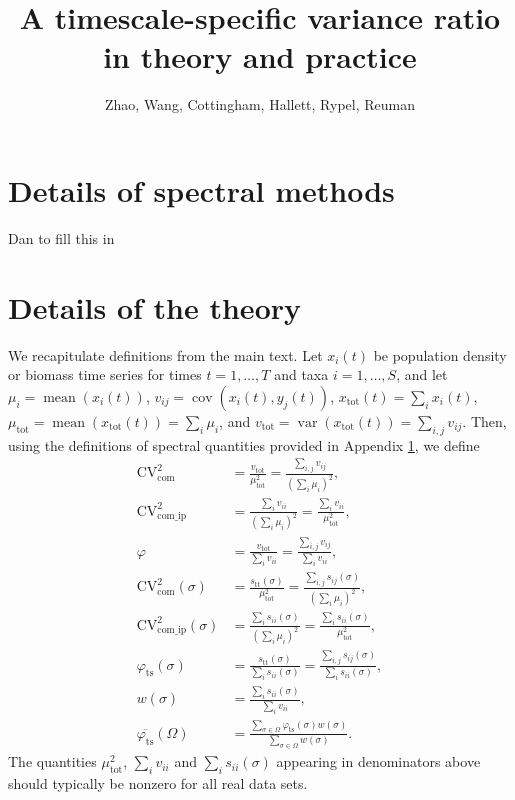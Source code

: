 \documentclass[letterpaper,11pt]{article}
\newcommand{\var}{{\operatorname{var}}}
\newcommand{\cov}{{\operatorname{cov}}}
\newcommand{\mean}{{\operatorname{mean}}}
\begin{document}
\title{A timescale-specific variance ratio in theory and practice}
\author{Zhao, Wang, Cottingham, Hallett, Rypel, Reuman}
\date{}
\maketitle

\section{Details of spectral methods}\label{sec:spec}
\noindent Dan to fill this in

\section{Details of the theory}
\noindent We recapitulate definitions from the main text. Let $x_i(t)$ be population 
density or biomass time series for times $t=1,\ldots,T$ and taxa $i=1,\ldots,S$, and 
let $\mu_i=\mean(x_i (t))$, $v_{ij}=\cov(x_i (t),y_j (t))$, $x_{\text{tot}} (t)=\sum_i x_i(t)$, $\mu_{\text{tot}}=\mean(x_{\text{tot}}(t))=\sum_i \mu_i$, and $v_{\text{tot}}=\var(x_{\text{tot}}(t))=\sum_{i,j}v_{ij}$. Then, using the definitions of spectral quantities provided in Appendix \ref{sec:spec}, we define
\begin{align}
\text{CV}_{\text{com}}^2 &= \frac{v_{\text{tot}}}{\mu_{\text{tot}}^2}=\frac{\sum_{i,j}v_{ij}}{(\sum_i \mu_i)^2},\\
\text{CV}_{\text{com\_ip}}^2 &=\frac{\sum_{i}v_{ii}}{(\sum_i \mu_i)^2}
=\frac{\sum_{i}v_{ii}}{\mu_{\text{tot}}^2},\\
\varphi &= \frac{v_{\text{tot}}}{\sum_i v_{ii}}
=\frac{\sum_{i,j}v_{ij}}{\sum_i v_{ii}}, \\
\text{CV}_{\text{com}}^2(\sigma) &= \frac{s_{\text{tt}}(\sigma)}{\mu_{\text{tot}}^2}
=\frac{\sum_{i,j} s_{ij}(\sigma)}{(\sum_i \mu_{i})^2},\\
\text{CV}_{\text{com\_ip}}^2(\sigma) &= \frac{\sum_i s_{ii}(\sigma)}{(\sum_i \mu_{i})^2}
=\frac{\sum_{i}s_{ii}(\sigma)}{\mu_{\text{tot}}^2},\\
\varphi_{\text{ts}}(\sigma) &= \frac{s_{\text{tt}}(\sigma)}{\sum_i s_{ii}(\sigma)}
=\frac{\sum_{i,j}s_{ij}(\sigma)}{\sum_i s_{ii}(\sigma)},\\
w(\sigma) &= \frac{\sum_i s_{ii}(\sigma)}{\sum_i v_{ii}},\\
\overline{\varphi_{\text{ts}}}(\Omega) &= \frac{\sum_{\sigma \in \Omega} \varphi_{\text{ts}}(\sigma) w(\sigma)}
{\sum_{\sigma \in \Omega} w(\sigma)}.
\end{align}
The quantities $\mu_{\text{tot}}^2$, $\sum_i v_{ii}$ and 
$\sum_i s_{ii}(\sigma)$ appearing in denominators above 
should typically be nonzero for all real data sets. 
\end{document}
